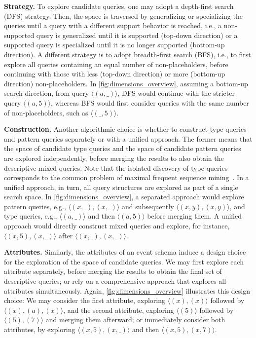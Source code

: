 \textbf{Strategy.} To explore candidate queries, one may adopt a
depth-first search (DFS) strategy. Then, the space is traversed by
generalizing or specializing the queries until a query with a different
support behavior is reached, i.e., a non-supported query is generalized
until it is supported (top-down direction) or a supported query is
specialized until it is no longer supported (bottom-up direction). A
different strategy
is to adopt breadth-first search (BFS), i.e., to first explore all
queries containing an equal number of non-placeholders, before continuing with
those with less (top-down
direction) or more (bottom-up
direction) non-placeholders. In \autoref{fig:dimensions_overview},  assuming a
bottom-up
search direction, from query
$\langle (a,\_) \rangle$, DFS would continue with the stricter query
$\langle (a,5) \rangle$, whereas BFS would first consider queries with the
same number of non-placeholders, such as $\langle (\_,5) \rangle$.


\textbf{Construction.}
Another algorithmic choice is whether to construct type queries and pattern
queries separately or with a unified approach. The former means that the
space of candidate type queries and the space of candidate pattern
queries are explored independently, before merging the results to also
obtain the descriptive mixed queries. Note that the isolated discovery of
type queries corresponds to the common problem of maximal frequent sequence
mining~\cite{10.1007/978-3-319-06483-3_8,10.1007/978-3-642-53914-5_15,10.1145/2757217}.
In a unified approach, in turn, all query structures are explored as part of
a single search space. In \autoref{fig:dimensions_overview}, a separated
approach would explore pattern queries, e.g., $\langle (x,\_),(x,\_) \rangle$
and subsequently $\langle (x,y),(x,y) \rangle$, and type queries, e.g.,
$\langle (a,\_)\rangle$ and then $\langle(a,5) \rangle$ before merging them. A
unified approach would directly construct mixed queries and explore, for
instance, $\langle (x,5),(x,\_)\rangle$ after $\langle (x,\_),(x,\_)\rangle$.

\textbf{Attributes.}
Similarly, the attributes of an event schema induce a
design choice for the exploration of the space of candidate
queries. We may first
explore each attribute separately, before merging the
results to obtain the final set of descriptive queries; or rely on a
comprehensive approach that explores all attributes
simultaneously. Again, \autoref{fig:dimensions_overview} illustrates this
design choice: We may consider the first attribute, exploring $\langle (x),(x)
\rangle$ followed by $\langle (x),(a),(x) \rangle$, and the second attribute,
exploring $\langle (5) \rangle$ followed by $\langle (5),(7) \rangle$ and merging them afterward;
or immediately consider both attributes, by exploring $\langle
(x,5),(x,\_) \rangle$ and then $\langle (x,5),(x,7) \rangle$.


